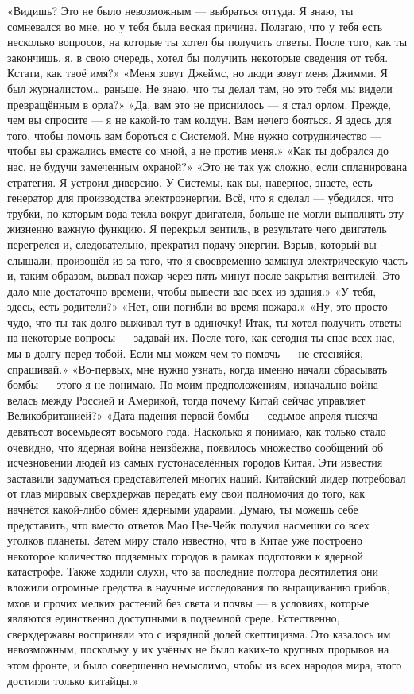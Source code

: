 \documentclass[a4paper,12pt]{book}
\begin{document}
	«Видишь? Это не было невозможным — выбраться оттуда. Я знаю, ты сомневался во мне, но у тебя была веская причина. Полагаю, что у тебя есть несколько вопросов, на которые ты хотел бы получить ответы. После того, как ты закончишь, я, в свою очередь, хотел бы получить некоторые сведения от тебя. Кстати, как твоё имя?»
	«Меня зовут Джеймс, но люди зовут меня Джимми. Я был журналистом… раньше. Не знаю, что ты делал там, но это тебя мы видели превращённым в орла?»
	«Да, вам это не приснилось — я стал орлом. Прежде, чем вы спросите — я не какой-то там колдун. Вам нечего бояться. Я здесь для того, чтобы помочь вам бороться с Системой. Мне нужно сотрудничество — чтобы вы сражались вместе со мной, а не против меня.»
	«Как ты добрался до нас, не будучи замеченным охраной?»
	«Это не так уж сложно, если спланирована стратегия. Я устроил диверсию. У Системы, как вы, наверное, знаете, есть генератор для производства электроэнергии. Всё, что я сделал — убедился, что трубки, по которым вода текла вокруг двигателя, больше не могли выполнять эту жизненно важную функцию. Я перекрыл вентиль, в результате чего двигатель перегрелся и, следовательно, прекратил подачу энергии. Взрыв, который вы слышали, произошёл из-за того, что я своевременно замкнул электрическую часть и, таким образом, вызвал пожар через пять минут после закрытия вентилей. Это дало мне достаточно времени, чтобы вывести вас всех из здания.»
	«У тебя, здесь, есть родители?»
	«Нет, они погибли во время пожара.»
	«Ну, это просто чудо, что ты так долго выживал тут в одиночку! Итак, ты хотел получить ответы на некоторые вопросы — задавай их. После того, как сегодня ты спас всех нас, мы в долгу перед тобой. Если мы можем чем-то помочь — не стесняйся, спрашивай.»
	«Во-первых, мне нужно узнать, когда именно начали сбрасывать бомбы — этого я не понимаю. По моим предположениям, изначально война велась между Россией и Америкой, тогда почему Китай сейчас управляет Великобританией?»
	«Дата падения первой бомбы — седьмое апреля тысяча девятьсот восемьдесят восьмого года. Насколько я понимаю, как только стало очевидно, что ядерная война неизбежна, появилось множество сообщений об исчезновении людей из самых густонаселённых городов Китая. Эти известия заставили задуматься представителей многих наций. Китайский лидер потребовал от глав мировых сверхдержав передать ему свои полномочия до того, как начнётся какой-либо обмен ядерными ударами. Думаю, ты можешь себе представить, что вместо ответов Мао Цзе-Чейк получил насмешки со всех уголков планеты. Затем миру стало известно, что в Китае уже построено некоторое количество подземных городов в рамках подготовки к ядерной катастрофе. Также ходили слухи, что за последние полтора десятилетия они вложили огромные средства в научные исследования по выращиванию грибов, мхов и прочих мелких растений без света и почвы — в условиях, которые являются единственно доступными в подземной среде. Естественно, сверхдержавы восприняли это с изрядной долей скептицизма. Это казалось им невозможным, поскольку у их учёных не было каких-то крупных прорывов на этом фронте, и было совершенно немыслимо, чтобы из всех народов мира, этого достигли только китайцы.»
\end{document}
